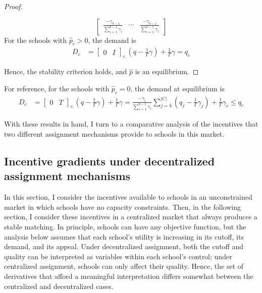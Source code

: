 \documentclass[12pt]{article}
\numberwithin{equation}{subsection}
\theoremstyle{definition}
\begin{document}
\begin{proof}
\begin{enumerate}
\begin{equation}
\begin{bmatrix}
\frac{-\gamma_{b-1}}{\sum_{i=1}^{b-1} \gamma_i} & \cdots & \frac{-\gamma_{b-1}}{\sum_{i=1}^{b-1} \gamma_i}
\end{bmatrix}\end{equation}
For the schools with $\hat p_c > 0$, the demand is
\begin{align} \label{demand-pc-gt-zero}
D_c &=
\begin{bmatrix}
0& I
\end{bmatrix}_{c.} \left(q - \frac{1}{\Gamma}\gamma\right) + \frac{1}{\Gamma}\gamma
= q_c
\end{align}
\end{enumerate}
Hence, the stability criterion holds, and $\hat p$ is an equilibrium.
\end{proof}

For reference, for the schools with $\hat p_c = 0$, the demand at equilibrium is 
\begin{align} \label{demand-pc-eq-zero}
D_c &=
\begin{bmatrix}
0& T
\end{bmatrix}_{c.} \left(q - \frac{1}{\Gamma}\gamma\right) + \frac{1}{\Gamma}\gamma  
= \frac{-\gamma_c}{\sum_{i=1}^{b-1} \gamma_i} \sum_{j=b}^{|C|} \left(q_j - \frac{1}{\Gamma}\gamma_j\right)  + \frac{1}{\Gamma}\gamma_c \leq q_c
\end{align}

With these results in hand, I turn to a comparative analysis of the incentives that two different assignment mechanisms provide to schools in this market.

\subsection{Incentive gradients under decentralized assignment mechanisms}
In this section, I consider the incentives available to schools in an unconstrained market in which schools have no capacity constraints. Then, in the following section, I consider these incentives in a centralized market that always produces a stable matching. In principle, schools can have any objective function, but the analysis below assumes that each school's utility is increasing in its cutoff, its demand, and its appeal. Under decentralized assignment, both the cutoff and quality can be interpreted as variables within each school's control; under centralized assignment, schools can only affect their quality. Hence, the set of derivatives that afford a meaningful interpretation differs somewhat between the centralized and decentralized cases. 
\end{document}
